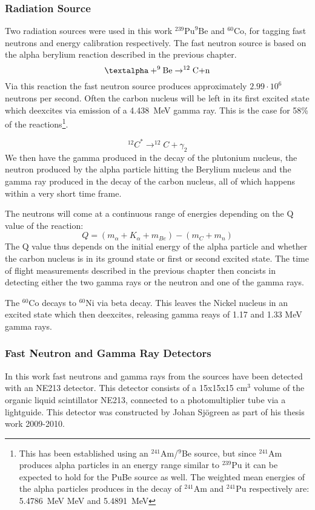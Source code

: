 \documentclass[main.tex]{subfiles}
\begin{document}
\subsubsection{Radiation Source}
Two radiation sources were used in this work $^\text{239}\text{Pu}^\text{9}\text{Be}$ and $^\text{60}\text{Co}$, for tagging fast neutrons and energy calibration respectively. The fast neutron source is based on the alpha berylium reaction described in the previous chapter.
$$\text{\textalpha}+^\text{9}\text{Be}\rightarrow^\text{12}\text{C+n}$$
Via this reaction the fast neutron source produces approximately $\text{2.99}\cdot\text{10}^\text{6}$ neutrons per second\cite{Scherzinger:2017}. Often the carbon nucleus will be left in its first excited state which deexcites via emission of a \SI{4.438}{\mega\eV} gamma ray. This is the case for 58\% of the reactions\cite{Scherzinger:2015}\footnote{This has been established using an $^\text{241}$Am/$^\text{9}$Be source, but since $^\text{241}$Am produces alpha particles in an energy range similar to $^\text{239}$Pu it can be expected to hold for the PuBe source as well. The weighted mean energies of the alpha particles produces in the decay of $^\text{241}$Am and $^\text{241}$Pu respectively are: \SI{5.4786}{\mega\eV} MeV and \SI{5.4891}{\mega\eV}\cite{Scherzinger:2017}}.

$$^{12}C^ {*}\rightarrow^{12}C+\gamma_2$$
We then have the gamma produced in the decay of the plutonium nucleus, the neutron produced by the alpha particle hitting the Berylium nucleus and the gamma ray produced in the decay of the carbon nucleus, all of which happens within a very short time frame. 

The neutrons will come at a continuous range of energies depending on the Q value of the reaction:
$$Q = (m_\alpha + K_\alpha + m_{Be}) - (m_{C} + m_n)$$
The Q value thus depends on the initial energy of the alpha particle and whether the carbon nucleus is in its ground state or first or second excited state. The time of flight measurements described in the previous chapter then concists in detecting either the two gamma rays or the neutron and one of the gamma rays.

The $^\text{60}\text{Co}$ decays to $^\text{60}\text{Ni}$ via beta decay. This leaves the Nickel nucleus in an excited state which then deexcites, releasing gamma reays of 1.17 and 1.33 MeV gamma rays\cite{Nudat}.

\subsubsection{Fast Neutron and Gamma Ray Detectors}
In this work fast neutrons and gamma rays from the sources have been detected with an NE213 detector. This detector consists of a 15x15x15 \si{\cm}$^\text{3}$ volume of the organic liquid scintillator NE213, connected to a photomultiplier tube via a lightguide. This detector was constructed by Johan Sjögreen as part of his thesis work 2009-2010\cite{sjogren}.
\end{document}

